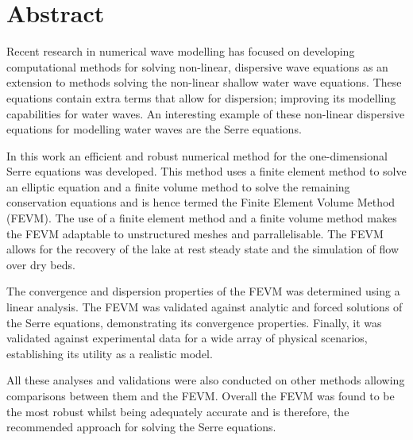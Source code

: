 \chapter*{Abstract}\label{abstract}


Recent research in numerical wave modelling has focused on developing computational methods for solving non-linear, dispersive wave equations as an extension to methods solving the non-linear shallow water wave equations. These equations contain extra terms that allow for dispersion; improving its modelling capabilities for water waves. An interesting example of these non-linear dispersive equations for modelling water waves are the Serre equations. 

In this work an efficient and robust numerical method for the one-dimensional Serre equations was developed. This method uses a finite element method to solve an elliptic equation and a finite volume method to solve the remaining conservation equations and is hence termed the Finite Element Volume Method (FEVM). The use of a finite element method and a finite volume method makes the FEVM adaptable to unstructured meshes and parrallelisable. The FEVM allows for the recovery of the lake at rest steady state and the simulation of flow over dry beds.

The convergence and dispersion properties of the FEVM was determined using a linear analysis. The FEVM was validated against analytic and forced solutions of the Serre equations, demonstrating its convergence properties. Finally, it was validated against experimental data for a wide array of physical scenarios, establishing its utility as a realistic model.

All these analyses and validations were also conducted on other methods allowing comparisons between them and the FEVM. Overall the FEVM was found to be the most robust whilst being adequately accurate and is therefore, the recommended approach for solving the Serre equations.



